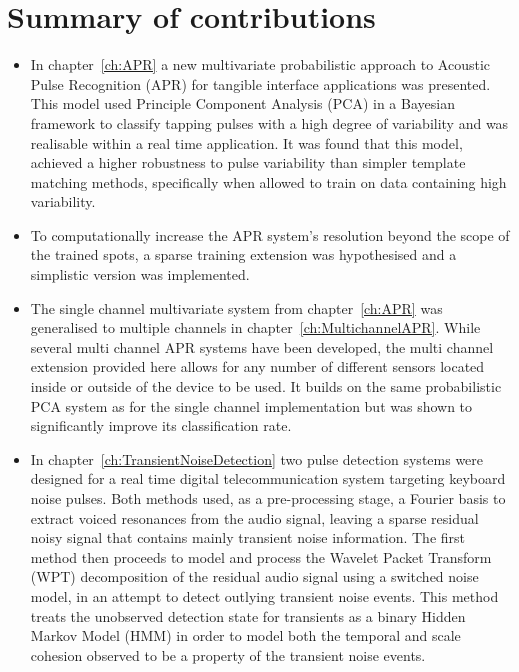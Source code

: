 \section{Summary of contributions}
\begin{itemize}
  \item In chapter~\ref{ch:APR} a new multivariate probabilistic approach to Acoustic Pulse Recognition (APR) for tangible interface applications was presented. This model used Principle Component Analysis (PCA) in a Bayesian framework to classify tapping pulses with a high degree of variability and was realisable within a real time application. It was found that this model, achieved a higher robustness to pulse variability than simpler template matching methods, specifically when allowed to train on data containing high variability.
  \item To computationally increase the APR system's resolution beyond the scope of the trained spots, a sparse training extension was hypothesised and a simplistic version was implemented.
  \item The single channel multivariate system from chapter~\ref{ch:APR} was generalised to multiple channels in chapter~\ref{ch:MultichannelAPR}. While several multi channel APR systems have been developed, the multi channel extension provided here allows for any number of different sensors located inside or outside of the device to be used. It builds on the same probabilistic PCA system as for the single channel implementation but was shown to significantly improve its classification rate.
  \item In chapter~\ref{ch:TransientNoiseDetection} two pulse detection systems were designed for a real time digital telecommunication system targeting keyboard noise pulses. Both methods used, as a pre-processing stage, a Fourier basis to extract voiced resonances from the audio signal, leaving a sparse residual noisy signal that contains mainly transient noise information. The first method then proceeds to model and process the Wavelet Packet Transform (WPT) decomposition of the residual audio signal using a switched noise model, in an attempt to detect outlying transient noise events. This method treats the unobserved detection state for transients as a binary Hidden Markov Model (HMM) in order to model both the temporal and scale cohesion observed to be a property of the transient noise events.

\end{itemize}
